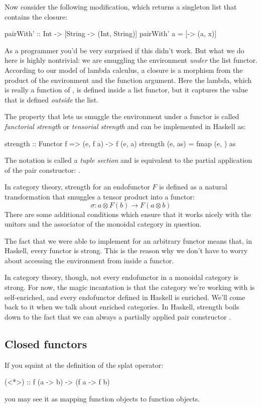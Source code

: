 \documentclass[DaoFP]{subfiles}
\begin{document}
Now consider the following modification, which returns a singleton list that contains the closure:
\begin{haskell}
pairWith' :: Int -> [String -> (Int, String)]
pairWith' a = [\x -> (a, x)]
\end{haskell}
As a programmer you'd be very surprised if this didn't work. But what we do here is highly nontrivial: we are smuggling the environment \emph{under} the list functor. According to our model of lambda calculus, a closure is a morphism from the product of the environment and the function argument. Here the lambda, which is really a function of , is defined inside a list functor, but it captures the value  that is defined \emph{outside} the list.

The property that lets us smuggle the environment under a functor is called \emph{functorial strength} or \emph{tensorial strength} and can be implemented in Haskell as:
\begin{haskell}
strength :: Functor f => (e, f a) -> f (e, a)
strength (e, as) = fmap (e, ) as
\end{haskell}
The notation  is called a \emph{tuple section} and is equivalent to the partial application of the pair constructor: .

In category theory, strength for an endofunctor $F$ is defined as a natural transformation that smuggles a tensor product into a functor:
\[ \sigma \colon a \otimes F(b) \to F (a \otimes b) \]
There are some additional conditions which ensure that it works nicely with the unitors and the associator of the monoidal category in question.

The fact that we were able to implement  for an arbitrary functor means that, in Haskell, every functor is strong. This is the reason why we don't have to worry about accessing the environment from inside a functor. 

In category theory, though, not every endofunctor in a monoidal category is strong. For now, the magic incantation is that the category we're working with is self-enriched, and every endofunctor defined in Haskell is enriched. We'll come back to it when we talk about enriched categories. In Haskell, strength boils down to the fact that we can always  a partially applied pair constructor .


\subsection{Closed functors}
If you squint at the definition of the splat operator:
\begin{haskell}
(<*>) :: f (a -> b) -> (f a -> f b)
\end{haskell}
you may see it as mapping function objects to function objects. 
\end{document}
